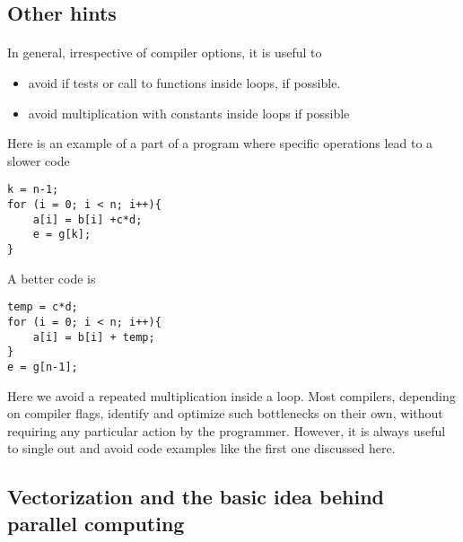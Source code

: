 \documentclass[%
oneside,                 %
final,                   %
10pt]{article}
\begin{document}
\subsection*{Other hints}

\paragraph{}
In general, irrespective of compiler options, it is useful to
\begin{itemize}
\item avoid if tests or call to functions inside loops, if possible. 

\item avoid multiplication with constants inside loops if possible
\end{itemize}

\noindent
Here is an example of a part of a program where specific operations lead to a slower code






\begin{verbatim}
k = n-1;
for (i = 0; i < n; i++){
    a[i] = b[i] +c*d;
    e = g[k];
}

\end{verbatim}

A better code is






\begin{verbatim}
temp = c*d;
for (i = 0; i < n; i++){
    a[i] = b[i] + temp;
}
e = g[n-1];

\end{verbatim}

Here we avoid a repeated multiplication inside a loop. 
Most compilers, depending on compiler flags, identify and optimize such bottlenecks on their own, without requiring any particular action by the programmer. However, it is always useful to single out and avoid code examples like the first one discussed here.



\subsection*{Vectorization and the basic idea behind parallel computing}
\end{document}

